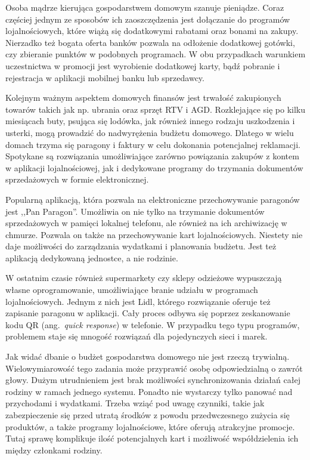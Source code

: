 Osoba mądrze kierująca gospodarstwem domowym szanuje pieniądze. Coraz częściej jednym ze sposobów ich zaoszczędzenia jest dołączanie do programów lojalnościowych, które wiążą się dodatkowymi rabatami oraz bonami na zakupy. Nierzadko też bogata oferta banków pozwala na odłożenie dodatkowej gotówki, czy zbieranie punktów w podobnych programach. W obu przypadkach warunkiem uczestnictwa w promocji jest wyrobienie dodatkowej karty, bądź pobranie i rejestracja w aplikacji mobilnej banku lub sprzedawcy.

Kolejnym ważnym aspektem domowych finansów jest trwałość zakupionych towarów takich jak np. ubrania oraz sprzęt RTV i AGD. Rozklejające się po kilku miesiącach buty, psująca się lodówka, jak również innego rodzaju uszkodzenia i usterki, mogą prowadzić do nadwyrężenia budżetu domowego. Dlatego w wielu domach trzyma się paragony i faktury w celu dokonania potencjalnej reklamacji. Spotykane są rozwiązania umożliwiające zarówno powiązania zakupów z kontem w aplikacji lojalnościowej, jak i dedykowane programy do trzymania dokumentów sprzedażowych w formie elektronicznej.

Popularną aplikacją, która pozwala na elektroniczne przechowywanie paragonów jest ,,Pan Paragon''. Umożliwia on nie tylko na trzymanie dokumentów sprzedażowych w pamięci lokalnej telefonu, ale również na ich archiwizację w chmurze. Pozwala on także na przechowywanie kart lojalnościowych. Niestety nie daje możliwości do zarządzania wydatkami i planowania budżetu. Jest też aplikacją dedykowaną jednostce, a nie rodzinie.

W ostatnim czasie również supermarkety czy sklepy odzieżowe wypuszczają własne oprogramowanie, umożliwiające branie udziału w programach lojalnościowych. Jednym z nich jest Lidl, którego rozwiązanie oferuje też zapisanie paragonu w aplikacji. Cały proces odbywa się poprzez zeskanowanie kodu QR (ang.~\emph{quick response}) w telefonie. W przypadku tego typu programów, problemem staje się mnogość rozwiązań dla pojedynczych sieci i marek.

Jak widać dbanie o budżet gospodarstwa domowego nie jest rzeczą trywialną. Wielowymiarowość tego zadania może przyprawić osobę odpowiedzialną o zawrót głowy. Dużym utrudnieniem jest brak możliwości synchronizowania działań całej rodziny w ramach jednego systemu. Ponadto nie wystarczy tylko panować nad przychodami i wydatkami. Trzeba wziąć pod uwagę czynniki, takie jak zabezpieczenie się przed utratą środków z powodu przedwczesnego zużycia się produktów, a także  programy lojalnościowe, które oferują atrakcyjne promocje. Tutaj sprawę komplikuje ilość potencjalnych kart i możliwość współdzielenia ich między członkami rodziny. 

